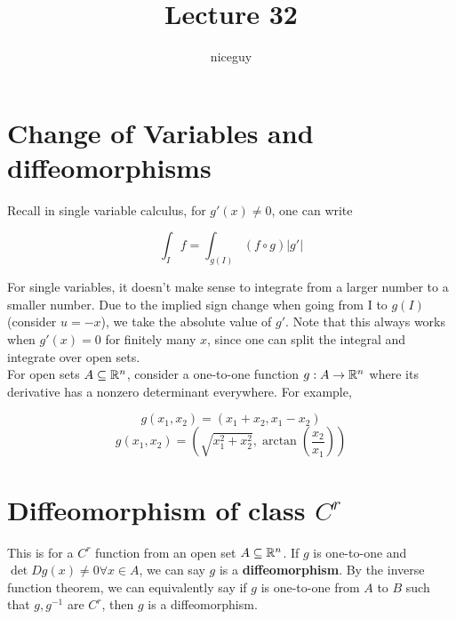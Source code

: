 \documentclass[12pt]{article}
\title{Lecture 32}
\author{niceguy}
\begin{document}
\maketitle

\section{Change of Variables and diffeomorphisms}

Recall in single variable calculus, for $g'(x) \neq 0$, one can write

$$\int_I f = \int_{g(I)} (f \circ g) |g'|$$

For single variables, it doesn't make sense to integrate from a larger number to a smaller number. Due to the implied sign change when going from I to $g(I)$ (consider $u = -x$), we take the absolute value of $g'$. Note that this always works when $g'(x) = 0$ for finitely many $x$, since one can split the integral and integrate over open sets. \\

For open sets $A \subseteq \mathbb{R}^n$, consider a one-to-one function $g:A \rightarrow \mathbb{R}^n$ where its derivative has a nonzero determinant everywhere. For example,

$$g(x_1,x_2) = (x_1+x_2,x_1-x_2)$$
$$g(x_1,x_2) = \left(\sqrt{x_1^2+x_2^2}, \arctan\left(\frac{x_2}{x_1}\right)\right)$$

\section{Diffeomorphism of class $C^r$}

This is for a $C^r$ function from an open set $A \subseteq \mathbb{R}^n$. If $g$ is one-to-one and $\det Dg(x) \neq 0 \forall x \in A$, we can say $g$ is a \textbf{diffeomorphism}. By the inverse function theorem, we can equivalently say if $g$ is one-to-one from $A$ to $B$ such that $g,g^{-1}$ are $C^r$, then $g$ is a diffeomorphism.
\end{document}
